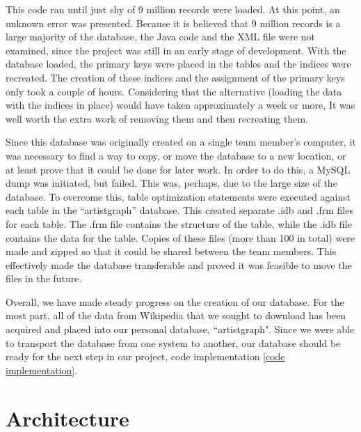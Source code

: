\documentclass{sig-alternate}
\begin{document}
This code ran until just shy of 9 million records were loaded. At this point, an unknown error
was presented. Because it is believed that 9 million records is a large majority of the
database, the Java code and the XML file were not examined, since the project was still in an early stage of development. 
With the database loaded, the primary keys were placed in the tables and the indices were recreated.  
The creation of these indices and the assignment of the primary keys only took a couple of hours. 
Considering that the alternative (loading the data with the indices in place) would have taken approximately a week or more,
It was well worth the extra work of removing them and then recreating them.
 
Since this database was originally created on a single team member's computer, it was necessary to find a way to copy, 
or move the database to a new location, or at least prove that it could be done for later work.
In order to do this, a MySQL dump was initiated, but failed. This was, perhaps, due to the large size of the database. 
To overcome this, table optimization statements were executed against each table in the ``artistgraph'' database. 
This created separate .idb and .frm files for each table. The .frm file contains the structure of the table, while the 
.idb file contains the data for the table. Copies of these files (more than 100 in total) were made and zipped so that it could 
be shared between the team members. This effectively made the database transferable and proved it was feasible to move the files in the future.
 

Overall, we have made steady progress on the creation of our database. For the most part, 
all of the data from Wikipedia that we sought to download has been acquired and placed into
our personal database, ``artistgraph". Since we were able to transport the database from one system to another, 
our database should be ready for the next step in our project, code implementation
\ref{code implementation}. 

\section{Architecture}
\label{architecture}
\end{document}
